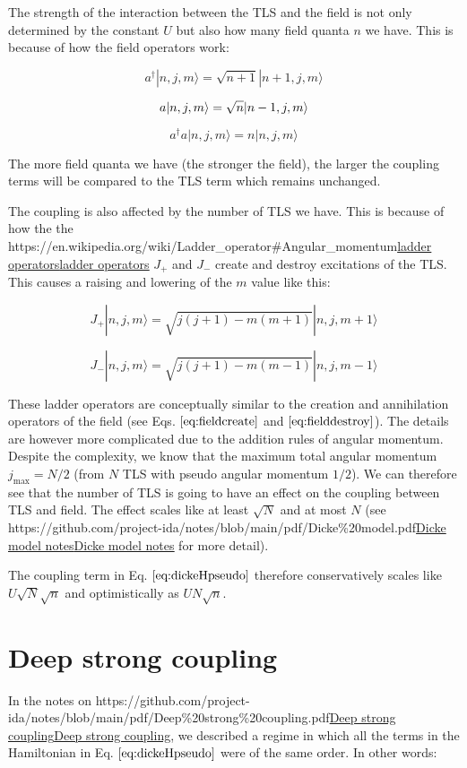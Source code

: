 \documentclass[
]{article}
\let\oldhref\href
\renewcommand{\href}[2]{\ifx#1\urlprefix\oldhref{#1}{#2}\else\uline{\oldhref{#1}{#2}}\fi}
\renewcommand{\[}{\begin{equation}}
\renewcommand{\]}{\end{equation}}
\begin{document}
The strength of the interaction between the TLS and the field is not
only determined by the constant \(U\) but also how many field quanta
\(n\) we have. This is because of how the field operators work:

\[
a^{\dagger} |n,j,m\rangle = \sqrt{n+1}|n+1,j,m\rangle
\label{eq:fieldcreate}
\]

\[
a |n,j,m\rangle = \sqrt{n}|n-1,j,m\rangle \\
\label{eq:fielddestroy}
\]

\[
a^{\dagger}a |n,j,m\rangle = n|n,j,m\rangle
\]

The more field quanta we have (the stronger the field), the larger the
coupling terms will be compared to the TLS term which remains unchanged.

The coupling is also affected by the number of TLS we have. This is
because of how the the
\href{https://en.wikipedia.org/wiki/Ladder_operator\#Angular_momentum}{ladder
operators} \(J_{+}\) and \(J_{-}\) create and destroy excitations of the
TLS. This causes a raising and lowering of the \(m\) value like this:

\[
J_+ |n, j, m\rangle  =  \sqrt{j(j + 1) - m(m + 1)} |n, j, m + 1\rangle
\]

\[
J_- |n, j, m\rangle =  \sqrt{j(j + 1) - m(m - 1)} |n, j, m - 1\rangle
\]

These ladder operators are conceptually similar to the creation and
annihilation operators of the field (see Eqs. \(\ref{eq:fieldcreate}\)
and \(\ref{eq:fielddestroy}\)). The details are however more complicated
due to the addition rules of angular momentum. Despite the complexity,
we know that the maximum total angular momentum \(j_{\max} = N/2\) (from
\(N\) TLS with pseudo angular momentum \(1/2\)). We can therefore see
that the number of TLS is going to have an effect on the coupling
between TLS and field. The effect scales like at least \(\sqrt{N}\) and
at most \(N\) (see
\href{https://github.com/project-ida/notes/blob/main/pdf/Dicke\%20model.pdf}{Dicke
model notes} for more detail).

The coupling term in Eq. \(\ref{eq:dickeHpseudo}\) therefore
conservatively scales like \(U\sqrt{N}\sqrt{n}\) and optimistically as
\(UN\sqrt{n}\).

\section{Deep strong coupling}\label{deep-strong-coupling}

In the notes on
\href{https://github.com/project-ida/notes/blob/main/pdf/Deep\%20strong\%20coupling.pdf}{Deep
strong coupling}, we described a regime in which all the terms in the
Hamiltonian in Eq. \(\ref{eq:dickeHpseudo}\) were of the same order. In
other words:
\end{document}
